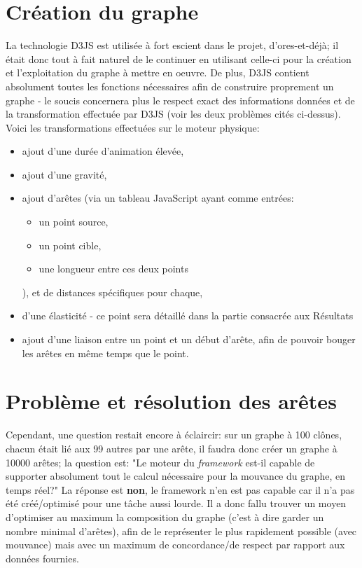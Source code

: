 \documentclass[12pt]{report}
\begin{document}
\begin{spacing}{1.2}
\section{Création du graphe}

La technologie D3JS est utilisée à fort escient dans le projet, d'ores-et-déjà; il était donc tout à fait naturel de le continuer en utilisant celle-ci pour la création et l'exploitation du graphe à mettre en oeuvre.
De plus, D3JS contient absolument toutes les fonctions nécessaires afin de construire proprement un graphe - le soucis concernera plus le respect exact des informations données et de la transformation effectuée par D3JS (voir les deux problèmes cités ci-dessus).
\newline
Voici les transformations effectuées sur le moteur physique:
\begin{itemize}
\item{ajout d'une durée d'animation élevée,}
\item{ajout d'une gravité,}
\item{ajout d'arêtes (via un tableau JavaScript ayant comme entrées:	
\begin{itemize}
\item{un point source,}
\item{un point cible,}
\item{une longueur entre ces deux points}
\end{itemize}
),
et de distances spécifiques pour chaque,}
\item{d'une élasticité - ce point sera détaillé dans la partie consacrée aux Résultats}
\item{ajout d'une liaison entre un point et un début d'arête, afin de pouvoir bouger les arêtes en même temps que le point.}
\end{itemize}

\section{Problème et résolution des arêtes}

Cependant, une question restait encore à éclaircir: sur un graphe à 100 clônes, chacun était lié aux 99 autres par une arête, il faudra donc créer un graphe à 10000 arêtes; la question est: "Le moteur du \textit{framework} est-il capable de supporter absolument tout le calcul nécessaire pour la mouvance du graphe, en temps réel?"
\newline
La réponse est \textbf{non}, le framework n'en est pas capable car il n'a pas été créé/optimisé pour une tâche aussi lourde.
\newline
Il a donc fallu trouver un moyen d'optimiser au maximum la composition du graphe (c'est à dire garder un nombre minimal d'arêtes), afin de le représenter le plus rapidement possible (avec mouvance) mais avec un maximum de concordance/de respect par rapport aux données fournies.


\end{spacing}
\end{document}
